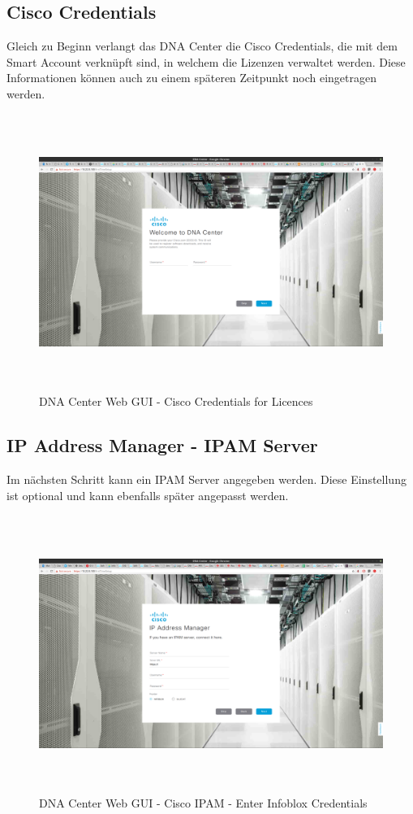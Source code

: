 \subsection{Cisco Credentials}
Gleich zu Beginn verlangt das DNA Center die Cisco Credentials, die mit dem Smart Account verknüpft sind, in welchem die Lizenzen verwaltet werden. Diese Informationen können auch zu einem späteren Zeitpunkt noch eingetragen werden.
\begin{figure}[H]
	\centering
	\includegraphics[height=9cm]{img/sc_006.png}
	\caption{DNA Center Web GUI - Cisco Credentials for Licences}
	\label{fig:installguide-dna-center-gui-2}
\end{figure}

\subsection{IP Address Manager - IPAM Server}

Im nächsten Schritt kann ein IPAM Server angegeben werden. Diese Einstellung ist optional und kann ebenfalls später angepasst werden. 

\begin{figure}[H]
	\centering
	\includegraphics[height=9cm]{img/sc_007.png}
	\caption{DNA Center Web GUI - Cisco IPAM - Enter Infoblox Credentials}
	\label{fig:installguide-dna-center-gui-3}
\end{figure}

